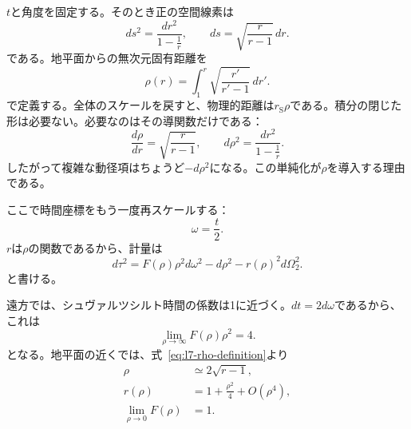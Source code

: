\(t\)と角度を固定する。そのとき正の空間線素は
\begin{equation}
ds^2=\frac{dr^2}{1-\frac1r},
\qquad
ds=\sqrt{\frac{r}{r-1}}\,dr.
\label{eq:l7-radial-proper-line}
\end{equation}
である。地平面からの無次元固有距離を
\begin{equation}
\rho(r)
=
\int_1^r\sqrt{\frac{r'}{r'-1}}\,dr'.
\label{eq:l7-rho-definition}
\end{equation}
で定義する。全体のスケールを戻すと、物理的距離は\(r_{\mathrm S}\rho\)である。積分の閉じた形は必要ない。必要なのはその導関数だけである：
\begin{equation}
\frac{d\rho}{dr}
=\sqrt{\frac{r}{r-1}},
\qquad
d\rho^2
=\frac{dr^2}{1-\frac1r}.
\label{eq:l7-rho-derivative}
\end{equation}
したがって複雑な動径項はちょうど\(-d\rho^2\)になる。この単純化が\(\rho\)を導入する理由である。

ここで時間座標をもう一度再スケールする：
\begin{equation}
\omega=\frac{t}{2}.
\label{eq:l7-omega}
\end{equation}
\(r\)は\(\rho\)の関数であるから、計量は
\begin{equation}
d\tau^2
=
F(\rho)\rho^2d\omega^2
-
d\rho^2
-
r(\rho)^2d\Omega_2^2.
\label{eq:l7-rho-metric}
\end{equation}
と書ける。

\begin{classroomqa}
\end{classroomqa}

遠方では、シュヴァルツシルト時間の係数は1に近づく。\(dt=2d\omega\)であるから、これは
\begin{equation}
\lim_{\rho\to\infty}F(\rho)\rho^2=4.
\label{eq:l7-far-limit}
\end{equation}
となる。地平面の近くでは、式~\eqref{eq:l7-rho-definition}より
\begin{equation}
\begin{aligned}
\rho&\simeq 2\sqrt{r-1},\\
r(\rho)&=1+\frac{\rho^2}{4}+O(\rho^4),\\
\lim_{\rho\to0}F(\rho)&=1.
\end{aligned}
\label{eq:l7-near-expansion}
\end{equation}

